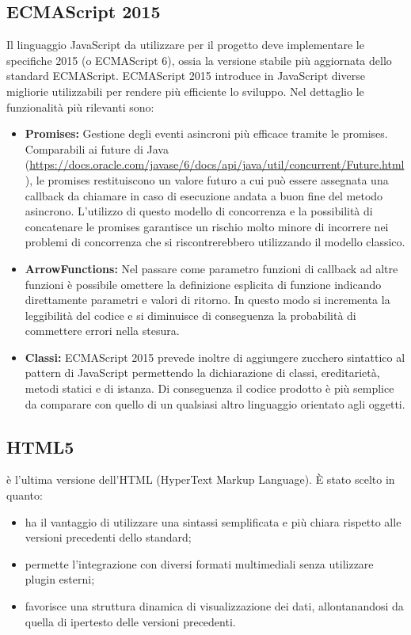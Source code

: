 \subsection{ECMAScript 2015}
Il linguaggio JavaScript da utilizzare per il progetto deve implementare le specifiche  2015 (o ECMAScript 6), ossia la versione stabile più aggiornata dello standard ECMAScript. 
ECMAScript 2015 introduce in JavaScript diverse migliorie utilizzabili per rendere più efficiente lo sviluppo. Nel dettaglio le funzionalità più rilevanti sono:
\begin{itemize}
	\item \textbf{Promises:} Gestione degli eventi asincroni più efficace tramite le promises. Comparabili ai future di Java (\url{https://docs.oracle.com/javase/6/docs/api/java/util/concurrent/Future.html}), le promises restituiscono un valore futuro a cui può essere assegnata una callback da chiamare in caso di esecuzione andata a buon fine del metodo asincrono. L'utilizzo di questo modello di concorrenza e la possibilità di concatenare le promises garantisce un rischio molto minore di incorrere nei problemi di concorrenza che si riscontrerebbero utilizzando il modello classico.
	\item \textbf{ArrowFunctions:} Nel passare come parametro funzioni di callback ad altre funzioni è possibile omettere la definizione esplicita di funzione indicando direttamente parametri e valori di ritorno. In questo modo si incrementa la leggibilità del codice e si diminuisce di conseguenza la probabilità di commettere errori nella stesura.
	\item \textbf{Classi:} ECMAScript 2015 prevede inoltre di aggiungere zucchero sintattico al pattern  di JavaScript permettendo la dichiarazione di classi, ereditarietà, metodi statici e di istanza. Di conseguenza il codice prodotto è più semplice da comparare con quello di un qualsiasi altro linguaggio orientato agli oggetti.
\end{itemize}

\subsection{HTML5}
 è l'ultima versione dell'HTML (HyperText Markup Language). È stato scelto in quanto:
\begin{itemize}
	\item ha il vantaggio di utilizzare una sintassi semplificata e più chiara rispetto alle versioni precedenti dello standard;
	\item permette l'integrazione con diversi formati multimediali senza utilizzare plugin esterni; 
	\item favorisce una struttura dinamica di visualizzazione dei dati, allontanandosi da quella di ipertesto delle versioni precedenti.
\end{itemize}


